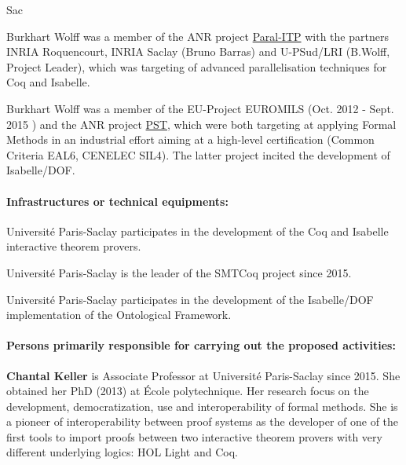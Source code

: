 \begin{sitedescription}{Sac}
\begin{compactitem}
\item Burkhart Wolff was a member of the ANR project
  \href{http://www.lri.fr/~wolff/projects/ANR-Paral-ITP/}{Paral-ITP}
  with the partners INRIA Roquencourt, INRIA Saclay (Bruno Barras) and
  U-PSud/LRI (B.Wolff, Project Leader), which was targeting of advanced
  parallelisation techniques for Coq and Isabelle.
\item Burkhart Wolff was a member of the EU-Project EUROMILS (Oct. 2012
  - Sept. 2015 ) and the ANR project
  \href{http://www.irt-systemx.fr/en/project/pst/}{PST}, which were both
  targeting at applying Formal Methods in an industrial effort aiming at
  a high-level certification (Common Criteria EAL6, CENELEC SIL4). The
  latter project incited the development of
  Isabelle/DOF\cite{brucker_achim_d_2019_3370483}.
\end{compactitem} 

\paragraph*{Infrastructures or technical equipments:}

\begin{compactitem}
\item Université Paris-Saclay participates in the development of the Coq
  and Isabelle interactive theorem provers.
\item Université Paris-Saclay is the leader of the SMTCoq project since
  2015.
\item Université Paris-Saclay participates in the development of the
  Isabelle/DOF implementation of the Ontological Framework.
\end{compactitem}

\paragraph*{Persons primarily responsible for carrying out the proposed
  activities:}

\begin{compactitem} %

\item {\bf Chantal Keller} is Associate Professor at Université
  Paris-Saclay since 2015. She obtained her PhD (2013) at École
  polytechnique. Her research focus on the development, democratization,
  use and interoperability of formal methods. She is a pioneer of
  interoperability between proof systems as the developer of one of the
  first tools to import proofs between two interactive theorem provers
  with very different underlying logics: HOL Light and Coq.


\end{compactitem}
\end{sitedescription}
